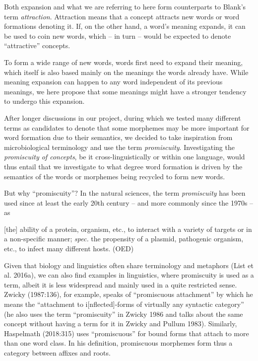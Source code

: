 \documentclass[
  a4paper,
  14pt,
  oneside,
  tablecaptionabove
]{scrbook}
\renewenvironment{quote}{\begin{customblockquote}\list{}{\rightmargin=0em\leftmargin=0em}%
\item\relax\color{blockquote-text}\ignorespaces}{\unskip\unskip\endlist\end{customblockquote}}
\begin{document}
Both expansion and what we are referring to here form counterparts to
Blank's term \emph{attraction}.  Attraction means that a concept
attracts new words or word formations denoting it. If, on the other
hand, a word's meaning expands, it can be used to coin new words, which
-- in turn -- would be expected to denote \enquote{attractive} concepts.

To form a wide range of new words, words first need to expand their
meaning, which itself is also based mainly on the meanings the words
already have. While meaning expansion can happen to any word independent
of its previous meanings, we here propose that some meanings might have
a stronger tendency to undergo this expansion.

After longer discussions in our project, during which we tested many
different terms as candidates to denote that some morphemes may be more
important for word formation due to their semantics, we decided to take
inspiration from microbiological terminology and use the term
\emph{promiscuity}.  Investigating the \emph{promiscuity of concepts},
be it cross-linguistically or within one language, would thus entail
that we investigate to what degree word formation is driven by the
semantics of the words or morphemes being recycled to form new words.

But why \enquote{promiscuity}? In the natural sciences, the term
\emph{promiscuity} has been used since at least the early 20th century
-- and more commonly since the 1970s -- as

\begin{quote}
{ {[}the{]} ability of a protein, organism, etc., to interact with a
variety of targets or in a non-specific manner; \emph{spec.} the
propensity of a plasmid, pathogenic organism, etc., to infect many
different hosts. (OED) }
\end{quote}

Given that biology and linguistics often share terminology and metaphors
(List et al. 2016a), we can also find examples in linguistics, where
promiscuity is used as a term, albeit it is less widespread and mainly
used in a quite restricted sense. Zwicky (1987:136), for example, speaks
of \enquote{promiscuous attachment} by which he means the
\enquote{attachment to i{[}nflected{]}-forms of virtually any syntactic
category} (he also uses the term \enquote{promiscuity} in Zwicky 1986
and talks about the same concept without having a term for it in Zwicky
and Pullum 1983). Similarly, Haspelmath (2018:315) uses
\enquote{promiscuous} for bound forms that attach to more than one word
class. In his definition, promiscuous morphemes form thus a category
between affixes and roots.
\end{document}
